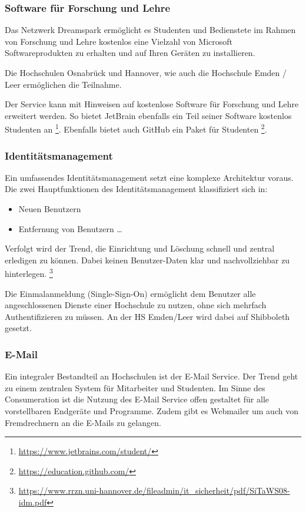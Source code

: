 \subsubsection{Software für Forschung und Lehre}
Das Netzwerk Dreamspark ermöglicht es Studenten und Bedienstete im Rahmen von Forschung und Lehre kostenlos eine Vielzahl von Microsoft Softwareprodukten zu erhalten und auf Ihren Geräten zu installieren.

Die Hochschulen Osnabrück und Hannover, wie auch die Hochschule Emden / Leer ermöglichen die Teilnahme.

Der Service kann mit Hinweisen auf kostenlose Software für Forschung und Lehre erweitert werden. So bietet JetBrain  ebenfalls ein Teil seiner Software kostenlos Studenten an \footnote{\url{https://www.jetbrains.com/student/}}. Ebenfalls bietet auch GitHub ein Paket für Studenten \footnote{\url{https://education.github.com/}}.


\subsubsection{Identitätsmanagement}
Ein umfassendes Identitätsmanagement setzt eine komplexe Architektur voraus. Die zwei Hauptfunktionen des Identitätsmanagement klassifiziert sich in:

\begin{itemize}
  \item Neuen Benutzern
  \item Entfernung von Benutzern \ldots
\end{itemize}


Verfolgt wird der Trend, die Einrichtung und Löschung schnell und zentral erledigen zu können. Dabei keinen Benutzer-Daten klar und nachvollziehbar zu hinterlegen. \footnote{\url{https://www.rrzn.uni-hannover.de/fileadmin/it_sicherheit/pdf/SiTaWS08-idm.pdf}}

Die Einmalanmeldung (Single-Sign-On) ermöglicht dem Benutzer alle angeschlossenen Dienste einer Hochschule zu nutzen, ohne sich mehrfach Authentifizieren zu müssen. An der HS Emden/Leer wird dabei auf Shibboleth gesetzt. 

\subsubsection{E-Mail}
Ein integraler Bestandteil an Hochschulen ist der E-Mail Service. Der Trend geht zu einem zentralen System für Mitarbeiter und Studenten. Im Sinne des Consumeration ist die Nutzung des E-Mail Service offen gestaltet für alle vorstellbaren Endgeräte und Programme. Zudem gibt es Webmailer um auch von Fremdrechnern an die E-Mails zu gelangen.

